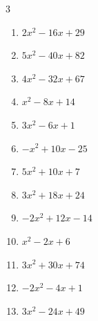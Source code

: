 \begin{multicols}{3}
\begin{enumerate}
  \item $2x^{2}-16x+29$


\columnbreak %

  \item $5x^{2}-40x+82$


  \item $4x^{2}-32x+67$


  \item $x^{2}-8x+14$


  \item $3x^{2}-6x+1$


  \item $-x^{2}+10x-25$


  \item $5x^{2}+10x+7$


  \item $3x^{2}+18x+24$


  \item $-2x^{2}+12x-14$


  \item $x^{2}-2x+6$


  \item $3x^{2}+30x+74$


\columnbreak %

\resetques

  \item $-2x^{2}-4x+1$


  \item $3x^{2}-24x+49$



\end{enumerate}
\end{multicols}
